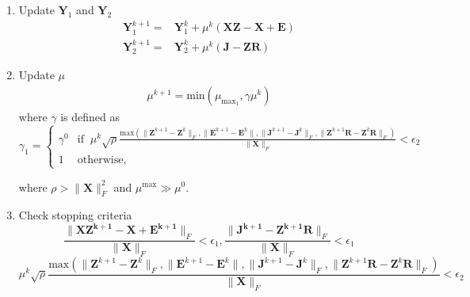 \documentclass{article}
\begin{document}
\begin{enumerate}
\item Update $\mathbf Y_1$ and $\mathbf Y_2$
\begin{align*}
\mathbf Y^{k+1}_1 =& \mathbf Y^k_1 + \mu^k (\mathbf{XZ - X + E})\\
\mathbf Y^{k+1}_2 =& \mathbf Y^k_2 + \mu^k (\mathbf{J - ZR})
\end{align*}

\item Update $\mu$
\begin{align*}
 \mu^{k+1} = \textrm{min}( \mu_{\text{max}_1}, \gamma \mu^k)
\end{align*}
where $\gamma$ is defined as
\[
\gamma_1 = 
\begin{cases}
\gamma^0 & \text{if} \;\; \mu^k \sqrt{\rho} \frac{ \textrm{max} ( \| \mathbf Z^{k+1} - \mathbf Z^{k}  \|_F  , \|  \mathbf E^{k+1} - \mathbf E^{k} \|, \| \mathbf J^{k+1} - \mathbf J^{k}  \|_F  , \|  \mathbf Z^{k+1} \mathbf R - \mathbf Z^{k} \mathbf R \|_F)}{\| \mathbf X \|_F}  < \epsilon_2 \\
1 & \text{otherwise,}
\end{cases}
\]

where $\rho > \|\mathbf X\|_F^2$ and $\mu^{\text{max}} \gg  \mu^0$.

\item Check stopping criteria
\[
\frac{\|\mathbf{XZ^{k+1} - X + E^{k+1}} \|_F}{\| \mathbf X \|_F} < \epsilon_1, \frac{\|\mathbf{J^{k+1} - Z^{k+1}R}\|_F}{\| \mathbf X \|_F} < \epsilon_1
\]
\[
\mu^k \sqrt{\rho} \frac{ \textrm{max} ( \| \mathbf Z^{k+1} - \mathbf Z^{k}  \|_F  , \|  \mathbf E^{k+1} - \mathbf E^{k} \|, \| \mathbf J^{k+1} - \mathbf J^{k}  \|_F  , \|  \mathbf Z^{k+1} \mathbf R - \mathbf Z^{k} \mathbf R \|_F)}{\| \mathbf X \|_F}  < \epsilon_2
\]

\end{enumerate}



\newpage


\end{document}
